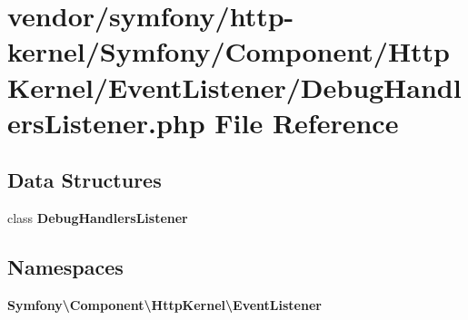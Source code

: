 \section{vendor/symfony/http-\/kernel/\+Symfony/\+Component/\+Http\+Kernel/\+Event\+Listener/\+Debug\+Handlers\+Listener.php File Reference}
\label{_debug_handlers_listener_8php}
\subsection*{Data Structures}
\begin{DoxyCompactItemize}
\item 
class {\bf Debug\+Handlers\+Listener}
\end{DoxyCompactItemize}
\subsection*{Namespaces}
\begin{DoxyCompactItemize}
\item 
 {\bf Symfony\textbackslash{}\+Component\textbackslash{}\+Http\+Kernel\textbackslash{}\+Event\+Listener}
\end{DoxyCompactItemize}
